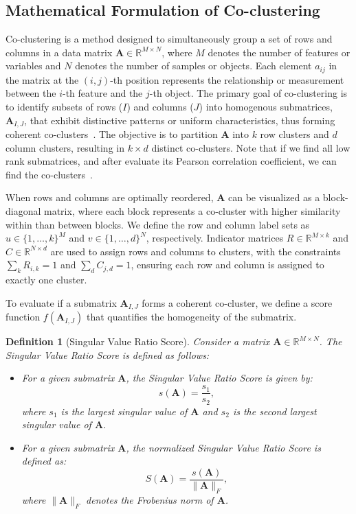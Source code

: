 \documentclass[journal]{IEEEtran}
\newtheorem{definition}{Definition}
\renewcommand{\cite}[1]{~\autocite{#1}}
\begin{document}
\subsection{Mathematical Formulation of Co-clustering}
Co-clustering is a method designed to simultaneously group a set of rows and columns in a data matrix $\mathbf{A} \in \mathbb{R}^{M \times N}$, where $M$ denotes the number of features or variables and $N$ denotes the number of samples or objects. Each element $a_{ij}$ in the matrix at the $(i, j)$-th position represents the relationship or measurement between the $i$-th feature and the $j$-th object. The primary goal of co-clustering is to identify subsets of rows ($I$) and columns ($J$) into homogenous submatrices, $\mathbf{A}_{I, J}$, that exhibit distinctive patterns or uniform characteristics, thus forming coherent co-clusters\cite{zhao2017DetectionCorrelatedCoclusters}. The objective is to partition $\mathbf{A}$ into $k$ row clusters and $d$ column clusters, resulting in $k \times d$ distinct co-clusters. Note that if we find all low rank submatrices, and after evaluate its Pearson correlation coefficient, we can find the co-clusters\cite{zhao2016IdentifyingMultidimensionalCoclusters}.

When rows and columns are optimally reordered, $\mathbf{A}$ can be visualized as a block-diagonal matrix, where each block represents a co-cluster with higher similarity within than between blocks. We define the row and column label sets as \( u \in \{1,\dots,k\}^M \) and \( v \in \{1,\dots,d\}^N \), respectively. Indicator matrices \( R \in \mathbb{R}^{M \times k} \) and \( C \in \mathbb{R}^{N \times d} \) are used to assign rows and columns to clusters, with the constraints \( \sum_k R_{i,k} = 1 \) and \( \sum_d C_{j,d} = 1 \), ensuring each row and column is assigned to exactly one cluster.

To evaluate if a submatrix $\mathbf{A}_{I, J}$ forms a coherent co-cluster, we define a score function \( f(\mathbf{A}_{I, J}) \) that quantifies the homogeneity of the submatrix.

\begin{definition}[Singular Value Ratio Score]
  \label{def:co_cluster}
  Consider a matrix \(\mathbf{A} \in \mathbb{R}^{M \times N}\). The Singular Value Ratio Score is defined as follows:
  \begin{itemize}
    \item For a given submatrix \(\mathbf{A}\), the Singular Value Ratio Score is given by:
          \[
            s(\mathbf{A}) = \frac{s_1}{s_2},
          \]
          where \(s_1\) is the largest singular value of \(\mathbf{A}\) and \(s_2\) is the second largest singular value of \(\mathbf{A}\).
    \item For a given submatrix \(\mathbf{A}\), the normalized Singular Value Ratio Score is defined as:
          \[
            S(\mathbf{A}) = \frac{s(\mathbf{A})}{\|\mathbf{A}\|_F},
          \]
          where \(\|\mathbf{A}\|_F\) denotes the Frobenius norm of \(\mathbf{A}\).
  \end{itemize}
\end{definition}
\end{document}
